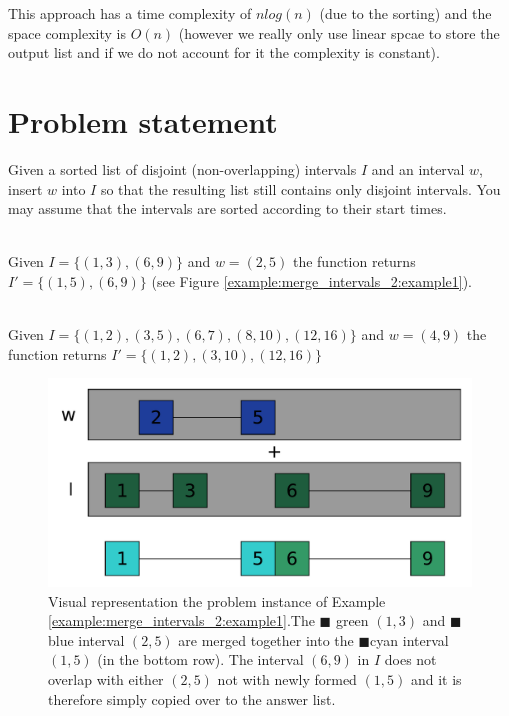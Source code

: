 This approach has a time complexity of $nlog(n)$ (due to the sorting) 
and the space complexity is $O(n)$ (however we really only use linear spcae to store the output list and if we do not account for it the complexity is constant).

\section{Problem statement}
\begin{exercise}
\label{example:merge_intervals_2:exercice1_2}

Given a sorted list of disjoint (non-overlapping) intervals $I$ and an interval $w$, insert $w$ into $I$ so that the resulting list still contains only disjoint intervals.
You may assume that the intervals are sorted according to their start times.

	\begin{example}
		\label{example:merge_intervals_2:example1}
		\hfill \\
		Given $I=\{(1,3),(6,9)\}$ and $w=(2,5)$ the function returns $I'=\{(1,5),(6,9)\}$ (see Figure \ref{example:merge_intervals_2:example1}).
	\end{example}

	\begin{example}
		\label{example:merge_intervals_2:example2}
		\hfill \\
		Given $I=\{(1,2),(3,5),(6,7),(8,10),(12,16)\}$ and $w=(4,9)$ the function returns $I'=\{(1,2),(3,10),(12,16)\}$
	\end{example}

\end{exercise}

\begin{figure}
	\centering
	\includegraphics[width=\textwidth]{sources/merge_intervals_2/images/example1}
	\caption[Implicit graph for the Example \ref{example:merge_intervals_2:example1}.]
	{Visual representation the problem instance of Example
	\ref{example:merge_intervals_2:example1}.The \textcolor[HTML]{339966}{$\blacksquare$} green $(1,3)$ and \textcolor[HTML]{3366ff}{$\blacksquare$} blue interval $(2,5)$  are merged together into the \textcolor[HTML]{33cccc}{$\blacksquare$}cyan interval $(1,5)$ (in the bottom row). The interval $(6,9)$ in $I$ does not overlap with either $(2,5)$ not with newly formed $(1,5)$ and it is therefore simply copied over to the answer list.}
	\label{fig:merge_intervals_2:example1}
\end{figure}


